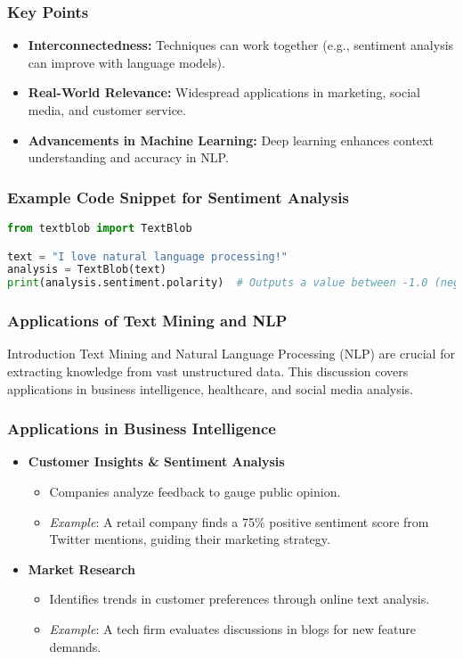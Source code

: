 \documentclass[aspectratio=169]{beamer}
\begin{document}
\begin{frame}
    \frametitle{Key Points}
    \begin{itemize}
        \item \textbf{Interconnectedness:} Techniques can work together (e.g., sentiment analysis can improve with language models).
        \item \textbf{Real-World Relevance:} Widespread applications in marketing, social media, and customer service.
        \item \textbf{Advancements in Machine Learning:} Deep learning enhances context understanding and accuracy in NLP.
    \end{itemize}
\end{frame}

\begin{frame}[fragile]
    \frametitle{Example Code Snippet for Sentiment Analysis}
    \begin{lstlisting}[language=Python]
from textblob import TextBlob

text = "I love natural language processing!"
analysis = TextBlob(text)
print(analysis.sentiment.polarity)  # Outputs a value between -1.0 (negative) and 1.0 (positive)
    \end{lstlisting}
\end{frame}

\begin{frame}[fragile]
    \frametitle{Applications of Text Mining and NLP}
    \begin{block}{Introduction}
        Text Mining and Natural Language Processing (NLP) are crucial for extracting knowledge from vast unstructured data. 
        This discussion covers applications in business intelligence, healthcare, and social media analysis.
    \end{block}
\end{frame}

\begin{frame}[fragile]
    \frametitle{Applications in Business Intelligence}
    \begin{itemize}
        \item \textbf{Customer Insights \& Sentiment Analysis}
            \begin{itemize}
                \item Companies analyze feedback to gauge public opinion.
                \item \textit{Example}: A retail company finds a 75\% positive sentiment score from Twitter mentions, guiding their marketing strategy.
            \end{itemize}
        \item \textbf{Market Research}
            \begin{itemize}
                \item Identifies trends in customer preferences through online text analysis.
                \item \textit{Example}: A tech firm evaluates discussions in blogs for new feature demands.
            \end{itemize}
    \end{itemize}
\end{frame}
\end{document}
